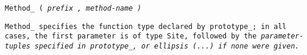 
\tt{Method_ (} \it{prefix} \tt{,} \it{method-name} \tt{)}


\tt{Method_} specifies the function type declared by \tt{prototype_};
in all cases, the first parameter is of type \tt{Site},
followed by the \it{parameter-tuples} specified in
\tt{prototype_}, or ellipsis (\tt{...}) if none were given.
